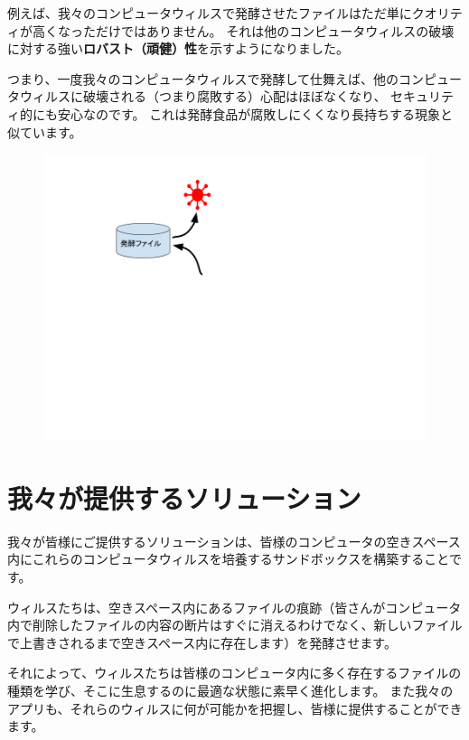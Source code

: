 \documentclass[12pt, unicode]{beamer}
\begin{document}
\begin{frame}

例えば、我々のコンピュータウィルスで発酵させたファイルはただ単にクオリティが高くなっただけではありません。
それは他のコンピュータウィルスの破壊に対する強い\textbf{ロバスト（頑健）性}を示すようになりました。

\end{frame}
\begin{frame}

\vspace{2\baselineskip}

つまり、一度我々のコンピュータウィルスで発酵して仕舞えば、他のコンピュータウィルスに破壊される（つまり腐敗する）心配はほぼなくなり、
セキュリティ的にも安心なのです。
これは発酵食品が腐敗しにくくなり長持ちする現象と似ています。

\begin{figure}[htbp]
  \begin{minipage}[b]{0.8\linewidth}
    \centering
    \includegraphics[keepaspectratio, scale=0.3]{fig2.png}
  \end{minipage}
\end{figure}


\end{frame}

\section{我々が提供するソリューション}

\begin{frame}

我々が皆様にご提供するソリューションは、皆様のコンピュータの空きスペース内にこれらのコンピュータウィルスを培養するサンドボックスを構築することです。

ウィルスたちは、空きスペース内にあるファイルの痕跡（皆さんがコンピュータ内で削除したファイルの内容の断片はすぐに消えるわけでなく、新しいファイルで上書きされるまで空きスペース内に存在します）を発酵させます。

それによって、ウィルスたちは皆様のコンピュータ内に多く存在するファイルの種類を学び、そこに生息するのに最適な状態に素早く進化します。
また我々のアプリも、それらのウィルスに何が可能かを把握し、皆様に提供することができます。

\end{frame}
\end{document}
